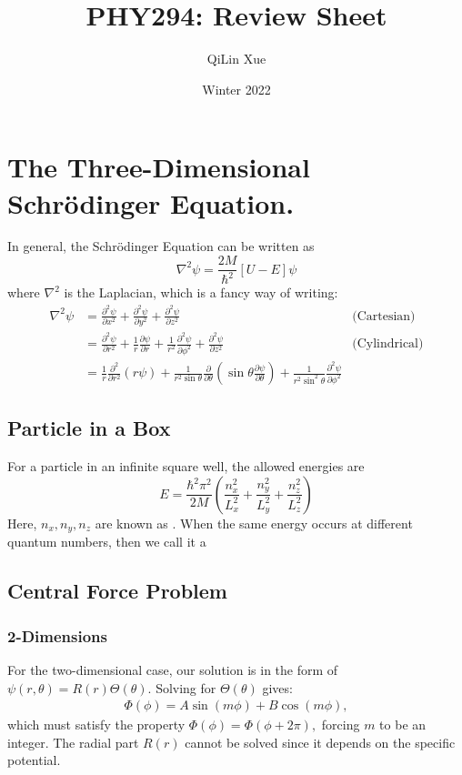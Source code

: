 \documentclass{article}
\title{PHY294: Review Sheet}
\author{QiLin Xue}
\date{Winter 2022}
\begin{document}
\maketitle
\section{The Three-Dimensional Schrödinger Equation.}
In general, the Schrödinger Equation can be written as
\begin{equation}
    \nabla^2 \psi = \frac{2M}{\hbar^2}[U-E]\psi
\end{equation}
where $\nabla^2$ is the Laplacian, which is a fancy way of writing:
\begin{align*}
    \nabla^2\psi &= \frac{\partial^2 \psi}{\partial x^2} + \frac{\partial^2 \psi}{\partial y^2} + \frac{\partial^2 \psi}{\partial z^2} & \text{(Cartesian)} \\
    &= \frac{\partial^2 \psi}{\partial r^2} + \frac{1}{r}\frac{\partial \psi}{\partial r} + \frac{1}{r^2}\frac{\partial^2 \psi}{\partial \phi^2} + \frac{\partial^2 \psi}{\partial z^2} & \text{(Cylindrical)} \\ 
    &= \frac{1}{r}\frac{\partial^2}{\partial r^2}(r\psi) + \frac{1}{r^2\sin\theta}\frac{\partial}{\partial\theta}\left(\sin\theta\frac{\partial\psi}{\partial\theta}\right) + \frac{1}{r^2\sin^2\theta}\frac{\partial^2\psi}{\partial \phi^2}
\end{align*}
\subsection{Particle in a Box}
For a particle in an infinite square well, the allowed energies are
\begin{equation}
    E = \frac{\hbar^2 \pi^2}{2M}\left(\frac{n_x^2}{L_x^2}+\frac{n_y^2}{L_y^2}+\frac{n_z^2}{L_z^2}\right)
\end{equation}
Here, $n_x,n_y,n_z$ are known as . When the same energy occurs at different quantum numbers, then we call it a 
\subsection{Central Force Problem}
\subsubsection*{2-Dimensions}
For the two-dimensional case, our solution is in the form of $\psi(r,\theta) = R(r)\Theta(\theta).$ Solving for $\Theta(\theta)$ gives:
\begin{align*}
    \Phi(\phi) = A\sin(m\phi) + B\cos(m\phi),
\end{align*}
which must satisfy the property $\Phi(\phi)=\Phi(\phi+2\pi),$ forcing $m$ to be an integer. The radial part $R(r)$ cannot be solved since it depends on the specific potential.
\end{document}
